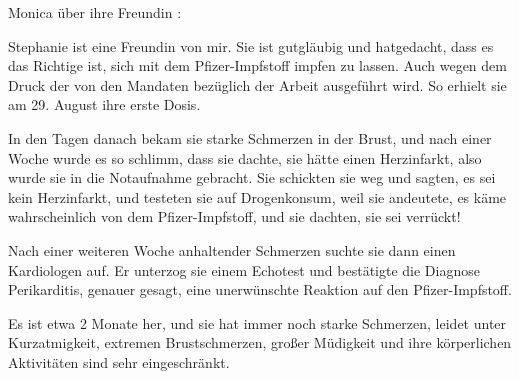 Monica über ihre Freundin :

Stephanie ist eine Freundin von mir. Sie ist gutgläubig und hatgedacht, dass es
das Richtige ist, sich mit dem Pfizer-Impfstoff impfen zu lassen. Auch wegen dem
Druck der von den Mandaten bezüglich der Arbeit ausgeführt wird. So erhielt sie
am 29. August ihre erste Dosis.

In den Tagen danach bekam sie starke Schmerzen in der Brust, und nach einer
Woche wurde es so schlimm, dass sie dachte, sie hätte einen Herzinfarkt, also
wurde sie in die Notaufnahme gebracht. Sie schickten sie weg und sagten, es sei
kein Herzinfarkt, und testeten sie auf Drogenkonsum, weil sie andeutete, es käme
wahrscheinlich von dem Pfizer-Impfstoff, und sie dachten, sie sei verrückt!

Nach einer weiteren Woche anhaltender Schmerzen suchte sie dann einen
Kardiologen auf. Er unterzog sie einem Echotest und bestätigte die Diagnose
Perikarditis, genauer gesagt, eine unerwünschte Reaktion auf den
Pfizer-Impfstoff.

Es ist etwa 2 Monate her, und sie hat immer noch starke Schmerzen, leidet unter
Kurzatmigkeit, extremen Brustschmerzen, großer Müdigkeit und ihre körperlichen
Aktivitäten sind sehr eingeschränkt.
